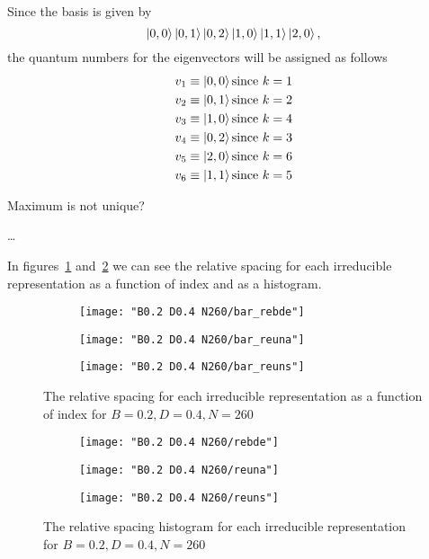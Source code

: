 \documentclass[../thesis.tex]{subfiles}
\begin{document}
Since the basis is given by
\[
  \ket{0, 0} \ket{0, 1} \ket{0, 2} \ket{1, 0} \ket{1, 1} \ket{2, 0},
\]
the quantum numbers for the eigenvectors will be assigned as follows
\begin{align*}
  v_1 &\equiv \ket{0, 0} \text{since}\ k = 1 \\
  v_2 &\equiv \ket{0, 1} \text{since}\ k = 2 \\
  v_3 &\equiv \ket{1, 0} \text{since}\ k = 4 \\
  v_4 &\equiv \ket{0, 2} \text{since}\ k = 3 \\
  v_5 &\equiv \ket{2, 0} \text{since}\ k = 6 \\
  v_6 &\equiv \ket{1, 1} \text{since}\ k = 5
\end{align*}

{\color{red} Maximum is not unique? \\ \centerline{\dots}}

In figures~\ref{fig:bar-rep-b0.2n120} and~\ref{fig:hist-rep-b0.2n120}
we can see the relative spacing for each irreducible representation as a function
of index and as a histogram.

\begin{figure}
  \centering
  \begin{subfigure}[b]{0.49\textwidth}
    \centering
    \texttt{[image: "B0.2 D0.4 N260/bar\_rebde"]}
  \end{subfigure}
  \begin{subfigure}[b]{0.49\textwidth}
    \centering
    \texttt{[image: "B0.2 D0.4 N260/bar\_reuna"]}
  \end{subfigure}
  \begin{subfigure}[b]{0.49\textwidth}
    \centering
    \texttt{[image: "B0.2 D0.4 N260/bar\_reuns"]}
  \end{subfigure}
  \caption{The relative spacing for each irreducible representation as a function
  of index for \(B=0.2, D=0.4, N=260\)}
  \label{fig:bar-rep-b0.2n120}
\end{figure}

\begin{figure}
  \centering
  \begin{subfigure}[b]{0.49\textwidth}
    \centering
    \texttt{[image: "B0.2 D0.4 N260/rebde"]}
  \end{subfigure}
  \begin{subfigure}[b]{0.49\textwidth}
    \centering
    \texttt{[image: "B0.2 D0.4 N260/reuna"]}
  \end{subfigure}
  \begin{subfigure}[b]{0.49\textwidth}
    \centering
    \texttt{[image: "B0.2 D0.4 N260/reuns"]}
  \end{subfigure}
  \caption{The relative spacing histogram for each irreducible representation for
  \(B=0.2, D=0.4, N=260\)}
\label{fig:hist-rep-b0.2n120}
\end{figure}
\end{document}
